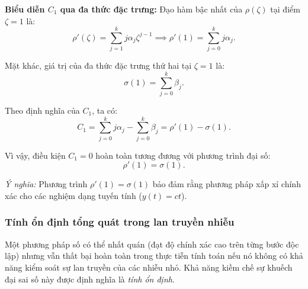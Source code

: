 \noindent \textbf{Biểu diễn $C_1$ qua đa thức đặc trưng:} Đạo hàm bậc nhất của $\rho(\zeta)$ tại điểm $\zeta = 1$ là:
\[
    \rho'(\zeta) = \sum_{j=1}^{k} j \alpha_j \zeta^{j-1} \implies \rho'(1) = \sum_{j=0}^{k} j \alpha_j.
\]

Mặt khác, giá trị của đa thức đặc trưng thứ hai tại $\zeta = 1$ là:
\[
    \sigma(1) = \sum_{j=0}^{k} \beta_j.
\]

Theo định nghĩa của $C_1$, ta có:
\[
    C_1 = \sum_{j=0}^{k} j \alpha_j - \sum_{j=0}^{k} \beta_j = \rho'(1) - \sigma(1).
\]

Vì vậy, điều kiện $C_1 = 0$ hoàn toàn tương đương với phương trình đại số:
\begin{equation}
    \rho'(1) = \sigma(1). \tag{2.14} \label{eq:2.14} 
\end{equation}

\textit{Ý nghĩa:} Phương trình $\rho'(1) = \sigma(1)$ bảo đảm rằng phương pháp xấp xỉ chính xác cho các nghiệm dạng tuyến tính ($y(t) = ct$).




\subsubsection{Tính ổn định tổng quát trong lan truyền nhiễu}

Một phương pháp số có thể nhất quán (đạt độ chính xác cao trên từng bước độc lập) nhưng vẫn thất bại hoàn toàn trong thực tiễn tính toán nếu nó không có khả năng kiểm soát sự lan truyền của các nhiễu nhỏ. Khả năng kiềm chế sự khuếch đại sai số này được định nghĩa là \textit{tính ổn định}.

